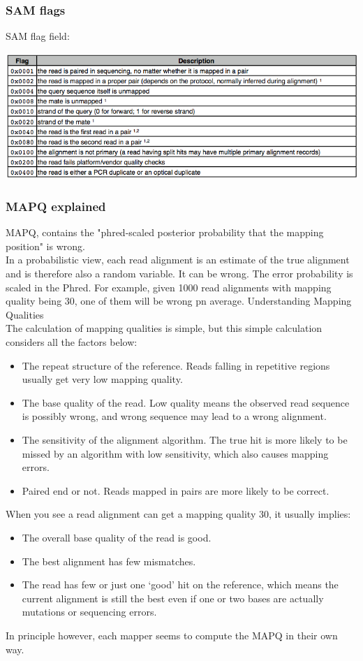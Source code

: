 \documentclass[pdf]{beamer}
\begin{document}
\begin{frame}
\frametitle{SAM flags}
SAM flag field:
\begin{center}
\includegraphics[scale=0.4]{Figures/Sam-flag.png} 
\end{center}
\end{frame}

\begin{frame}[allowframebreaks]
\frametitle{MAPQ explained}
MAPQ, contains the "phred-scaled posterior probability that the mapping position" is wrong.\\
\vspace{0.1in}
In a probabilistic view, each read alignment is an estimate of the true alignment and is therefore also a random variable. It can be wrong. The error probability is scaled in the Phred. For example, given 1000 read alignments with mapping quality being 30, one of them will be wrong pn average.
\vspace{0.1in}
Understanding Mapping Qualities\\
\vspace{0.1in}
The calculation of mapping qualities is simple, but this simple calculation considers all the factors below:
\begin{itemize}
\item The repeat structure of the reference. Reads falling in repetitive regions usually get very low mapping quality.
\item The base quality of the read. Low quality means the observed read sequence is possibly wrong, and wrong sequence may lead to a wrong alignment.
\item The sensitivity of the alignment algorithm. The true hit is more likely to be missed by an algorithm with low sensitivity, which also causes mapping errors.
\item Paired end or not. Reads mapped in pairs are more likely to be correct.
\end{itemize}
When you see a read alignment can get a mapping quality 30, it usually implies:\\
\begin{itemize}
\item The overall base quality of the read is good.
\item The best alignment has few mismatches.
\item The read has few or just one `good' hit on the reference, which means the current alignment is still the best even if one or two bases are actually mutations or sequencing errors.
\end{itemize}
\alert{In principle however, each mapper seems to compute the MAPQ in their own way.}
\end{frame}
\end{document}
